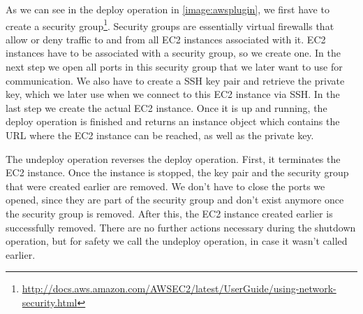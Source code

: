 As we can see in the deploy operation in \autoref{image:awsplugin}, we first have to create a security group\footnote{\url{http://docs.aws.amazon.com/AWSEC2/latest/UserGuide/using-network-security.html}}.
Security groups are essentially virtual firewalls that allow or deny traffic to and from all EC2 instances associated with it.
EC2 instances have to be associated with a security group, so we create one.
In the next step we open all ports in this security group that we later want to use for communication.
We also have to create a SSH key pair and retrieve the private key, which we later use when we connect to this EC2 instance via SSH.
In the last step we create the actual EC2 instance.
Once it is up and running, the deploy operation is finished and returns an instance object which contains the URL where the EC2 instance can be reached, as well as the private key.

The undeploy operation reverses the deploy operation.
First, it terminates the EC2 instance.
Once the instance is stopped, the key pair and the security group that were created earlier are removed.
We don't have to close the ports we opened, since they are part of the security group and don't exist anymore once the security group is removed.
After this, the EC2 instance created earlier is successfully removed.
There are no further actions necessary during the shutdown operation, but for safety we call the undeploy operation, in case it wasn't called earlier.
